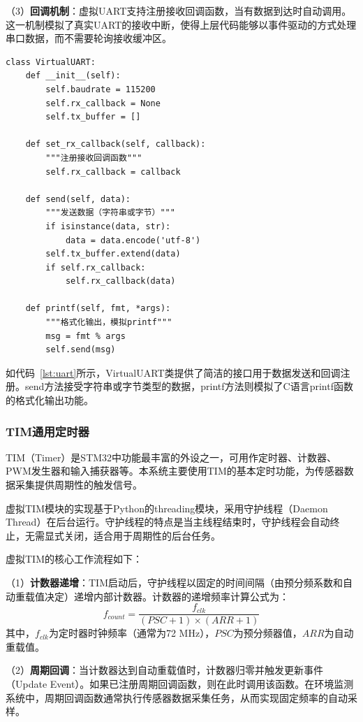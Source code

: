 \documentclass[12pt,a4paper]{ctexart}
\begin{document}
（3）\textbf{回调机制}：虚拟UART支持注册接收回调函数，当有数据到达时自动调用。这一机制模拟了真实UART的接收中断，使得上层代码能够以事件驱动的方式处理串口数据，而不需要轮询接收缓冲区。

\begin{lstlisting}[caption={虚拟UART回调注册与发送},label={lst:uart}]
class VirtualUART:
    def __init__(self):
        self.baudrate = 115200
        self.rx_callback = None
        self.tx_buffer = []
    
    def set_rx_callback(self, callback):
        """注册接收回调函数"""
        self.rx_callback = callback
    
    def send(self, data):
        """发送数据（字符串或字节）"""
        if isinstance(data, str):
            data = data.encode('utf-8')
        self.tx_buffer.extend(data)
        if self.rx_callback:
            self.rx_callback(data)
    
    def printf(self, fmt, *args):
        """格式化输出，模拟printf"""
        msg = fmt % args
        self.send(msg)
\end{lstlisting}

如代码~\ref{lst:uart}所示，VirtualUART类提供了简洁的接口用于数据发送和回调注册。send方法接受字符串或字节类型的数据，printf方法则模拟了C语言printf函数的格式化输出功能。

\subsubsection{TIM通用定时器}

TIM（Timer）是STM32中功能最丰富的外设之一，可用作定时器、计数器、PWM发生器和输入捕获器等。本系统主要使用TIM的基本定时功能，为传感器数据采集提供周期性的触发信号。

虚拟TIM模块的实现基于Python的threading模块，采用守护线程（Daemon Thread）在后台运行。守护线程的特点是当主线程结束时，守护线程会自动终止，无需显式关闭，适合用于周期性的后台任务。

虚拟TIM的核心工作流程如下：

（1）\textbf{计数器递增}：TIM启动后，守护线程以固定的时间间隔（由预分频系数和自动重载值决定）递增内部计数器。计数器的递增频率计算公式为：
\begin{equation}
    f_{count} = \frac{f_{clk}}{(PSC + 1) \times (ARR + 1)}
\end{equation}
其中，$f_{clk}$为定时器时钟频率（通常为72 MHz），$PSC$为预分频器值，$ARR$为自动重载值。

（2）\textbf{周期回调}：当计数器达到自动重载值时，计数器归零并触发更新事件（Update Event）。如果已注册周期回调函数，则在此时调用该函数。在环境监测系统中，周期回调函数通常执行传感器数据采集任务，从而实现固定频率的自动采样。
\end{document}
